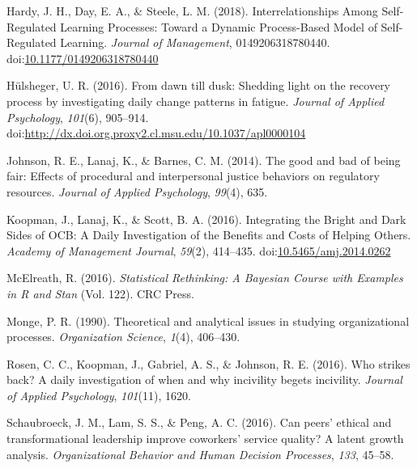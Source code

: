 \documentclass[english,,man]{apa6}
\theoremstyle{definition}
\theoremstyle{definition}
\theoremstyle{definition}
\theoremstyle{remark}
\begin{document}
\leavevmode\hypertarget{ref-hardy_interrelationships_2018}{}%
Hardy, J. H., Day, E. A., \& Steele, L. M. (2018). Interrelationships
Among Self-Regulated Learning Processes: Toward a Dynamic Process-Based
Model of Self-Regulated Learning. \emph{Journal of Management},
0149206318780440.
doi:\href{https://doi.org/10.1177/0149206318780440}{10.1177/0149206318780440}

\leavevmode\hypertarget{ref-hulsheger_dawn_2016}{}%
Hülsheger, U. R. (2016). From dawn till dusk: Shedding light on the
recovery process by investigating daily change patterns in fatigue.
\emph{Journal of Applied Psychology}, \emph{101}(6), 905--914.
doi:\href{https://doi.org/http://dx.doi.org.proxy2.cl.msu.edu/10.1037/apl0000104}{http://dx.doi.org.proxy2.cl.msu.edu/10.1037/apl0000104}

\leavevmode\hypertarget{ref-johnson_good_2014}{}%
Johnson, R. E., Lanaj, K., \& Barnes, C. M. (2014). The good and bad of
being fair: Effects of procedural and interpersonal justice behaviors on
regulatory resources. \emph{Journal of Applied Psychology},
\emph{99}(4), 635.

\leavevmode\hypertarget{ref-koopman_integrating_2016}{}%
Koopman, J., Lanaj, K., \& Scott, B. A. (2016). Integrating the Bright
and Dark Sides of OCB: A Daily Investigation of the Benefits and Costs
of Helping Others. \emph{Academy of Management Journal}, \emph{59}(2),
414--435.
doi:\href{https://doi.org/10.5465/amj.2014.0262}{10.5465/amj.2014.0262}

\leavevmode\hypertarget{ref-mcelreath_statistical_2016}{}%
McElreath, R. (2016). \emph{Statistical Rethinking: A Bayesian Course
with Examples in R and Stan} (Vol. 122). CRC Press.

\leavevmode\hypertarget{ref-monge_theoretical_1990}{}%
Monge, P. R. (1990). Theoretical and analytical issues in studying
organizational processes. \emph{Organization Science}, \emph{1}(4),
406--430.

\leavevmode\hypertarget{ref-rosen_who_2016}{}%
Rosen, C. C., Koopman, J., Gabriel, A. S., \& Johnson, R. E. (2016). Who
strikes back? A daily investigation of when and why incivility begets
incivility. \emph{Journal of Applied Psychology}, \emph{101}(11), 1620.

\leavevmode\hypertarget{ref-schaubroeck_can_2016}{}%
Schaubroeck, J. M., Lam, S. S., \& Peng, A. C. (2016). Can peers'
ethical and transformational leadership improve coworkers' service
quality? A latent growth analysis. \emph{Organizational Behavior and
Human Decision Processes}, \emph{133}, 45--58.
\end{document}
